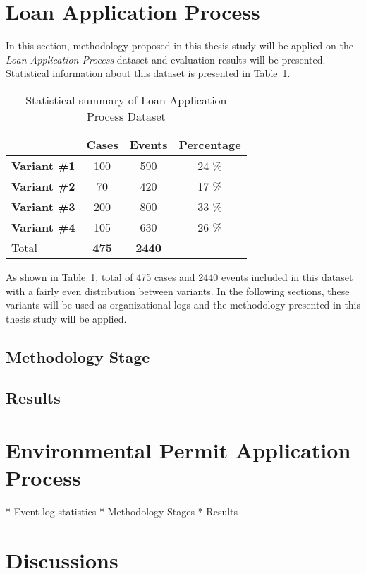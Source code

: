 \section{Loan Application Process}
\label{sec:loan-app-process}
In this section, methodology proposed in this thesis study will be applied on the \textit{Loan Application Process} dataset \cite{loan-app-data} and evaluation results will be presented. Statistical information about this dataset is presented in Table~\ref{table:loan-app-process-summary}.
\begin{table}[]
\centering
\caption{Statistical summary of Loan Application Process Dataset}
\label{table:loan-app-process-summary}
\begin{tabular}{@{}lccc@{}}
\toprule
                  & {\bf Cases} & {\bf Events} & {\bf Percentage} \\ \midrule
{\bf Variant \#1} & 100         & 590          & 24 \%            \\ \midrule
{\bf Variant \#2} & 70          & 420          & 17 \%            \\ \midrule
{\bf Variant \#3} & 200         & 800          & 33 \%            \\ \midrule
{\bf Variant \#4} & 105         & 630          & 26 \%            \\ \midrule
\rowcolor[HTML]{C0C0C0} 
Total             & {\bf 475}   & {\bf 2440}   & {\bf }           \\ \bottomrule
\end{tabular}
\end{table}

As shown in Table~\ref{table:loan-app-process-summary}, total of 475 cases and 2440 events included in this dataset with a fairly even distribution between variants. In the following sections, these variants will be used as organizational logs and the methodology presented in this thesis study will be applied.

\subsection{Methodology Stage}
\label{sec:loan-app-methodology}

\subsection{Results}
\label{sec:loan-app-results}


\section{Environmental Permit Application Process}
\label{sec:environmental-permit-application-process}
 
* Event log statistics
* Methodology Stages
* Results

\section{Discussions}
\label{sec:discussions}